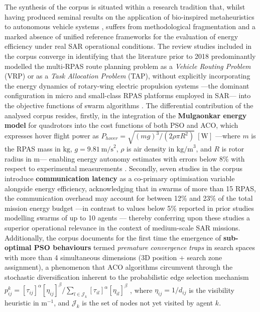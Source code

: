 The synthesis of the corpus is situated within a research tradition that, whilst having produced seminal results on the application of bio-inspired metaheuristics to autonomous vehicle systems \cite{puente2022, sharma2022, fevgas2022, israr2022}, suffers from methodological fragmentation and a marked absence of unified reference frameworks for the evaluation of energy efficiency under real SAR operational conditions. The review studies included in the corpus \cite{puente2022, sharma2022, fevgas2022, israr2022, aitsaadi2022, yang2023, tang2022} converge in identifying that the literature prior to 2018 predominantly modelled the multi-RPAS route planning problem as a \textit{Vehicle Routing Problem} (VRP) or as a \textit{Task Allocation Problem} (TAP), without explicitly incorporating the energy dynamics of rotary-wing electric propulsion systems —the dominant configuration in micro and small-class RPAS platforms employed in SAR— into the objective functions of swarm algorithms \cite{sharma2022, aitsaadi2022}. The differential contribution of the analysed corpus resides, firstly, in the integration of the \textbf{Mulgaonkar energy model} for quadrotors into the cost functions of both PSO and ACO, which expresses hover flight power as $P_{hover} = \sqrt{(mg)^3 / (2\rho \pi R^2)}\ [\text{W}]$ —where $m$ is the RPAS mass in $\text{kg}$, $g = 9.81\ \text{m/s}^2$, $\rho$ is air density in $\text{kg/m}^3$, and $R$ is rotor radius in $\text{m}$— enabling energy autonomy estimates with errors below 8\% with respect to experimental measurements \cite{lin2022, mathew2021, wang2025}. Secondly, seven studies in the corpus \cite{liu2021cassa, ntakolia2021, phung2021, chu2022, deng2023, xu2022, wang2025} introduce \textbf{communication latency} as a co-primary optimisation variable alongside energy efficiency, acknowledging that in swarms of more than 15 RPAS, the communication overhead may account for between 12\% and 23\% of the total mission energy budget —in contrast to values below 5\% reported in prior studies modelling swarms of up to 10 agents \cite{fevgas2022, yang2023}— thereby conferring upon these studies a superior operational relevance in the context of medium-scale SAR missions. Additionally, the corpus documents for the first time the emergence of \textbf{sub-optimal PSO behaviours} termed \textit{premature convergence traps} in search spaces with more than 4 simultaneous dimensions (3D position + search zone assignment), a phenomenon that ACO algorithms circumvent through the stochastic diversification inherent to the probabilistic edge selection mechanism $p_{ij}^k = [\tau_{ij}]^\alpha [\eta_{ij}]^\beta / \sum_{l \in \mathcal{J}_k} [\tau_{il}]^\alpha [\eta_{il}]^\beta$ \cite{phung2021, shafiq2022, ahmed2021}, where $\eta_{ij} = 1/d_{ij}$ is the visibility heuristic in $\text{m}^{-1}$, and $\mathcal{J}_k$ is the set of nodes not yet visited by agent $k$.

